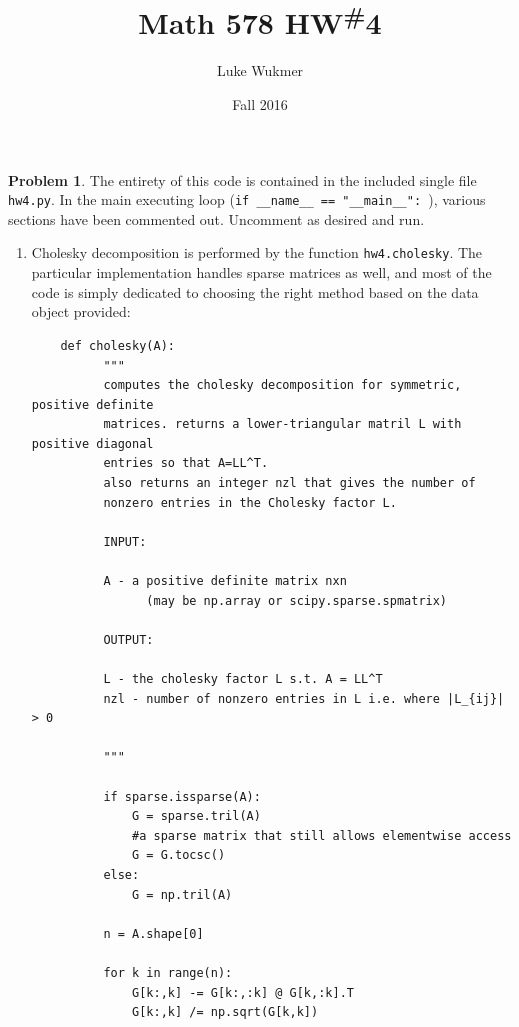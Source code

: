 \documentclass[10pt]{article}
\theoremstyle{definition}
\newtheorem{prob}{Problem}
\begin{document}
\title{Math 578 HW\textsuperscript{\#}4}
\author{Luke Wukmer}
\date{Fall 2016}
\maketitle \thispagestyle{empty} %



\begin{prob} 
    The entirety of this code is contained in the included single file \texttt{hw4.py}. 
    In the main executing loop (\verb;if __name__ == "__main__": ;),
    various sections have been commented out. Uncomment as desired and run.
    \begin{enumerate}[\bfseries(a)]
        \item
            Cholesky decomposition is performed by the function \texttt{hw4.cholesky}.
            The particular implementation handles sparse matrices as well, and most of the code is
            simply dedicated to choosing the right method based on the data object provided:
            
    \begin{lstlisting}
    def cholesky(A): 
          """ 
          computes the cholesky decomposition for symmetric, positive definite 
          matrices. returns a lower-triangular matril L with positive diagonal 
          entries so that A=LL^T.
          also returns an integer nzl that gives the number of 
          nonzero entries in the Cholesky factor L. 
       
          INPUT: 
       
          A - a positive definite matrix nxn
                (may be np.array or scipy.sparse.spmatrix)
       
          OUTPUT: 
       
          L - the cholesky factor L s.t. A = LL^T 
          nzl - number of nonzero entries in L i.e. where |L_{ij}| > 0 
       
          """ 
           
          if sparse.issparse(A): 
              G = sparse.tril(A) 
              #a sparse matrix that still allows elementwise access 
              G = G.tocsc()
          else: 
              G = np.tril(A) 
              
          n = A.shape[0] 
       
          for k in range(n): 
              G[k:,k] -= G[k:,:k] @ G[k,:k].T 
              G[k:,k] /= np.sqrt(G[k,k]) 
           

\end{lstlisting}
\end{enumerate}
\end{prob}
\end{document}
